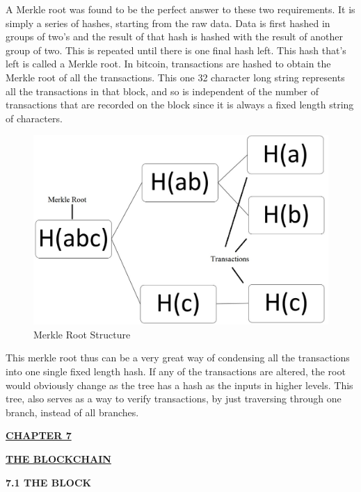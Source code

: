 \documentclass[12pt,a4paper]{report}
\begin{document}
\begin{justify}
A Merkle root was found to be the perfect answer to these two requirements. It is simply a series of hashes, starting from the raw data. Data is first hashed in groups of two's and the result of that hash is hashed with the result of another group of two. This is repeated until there is one final hash left. This hash that's left is called a Merkle root. In bitcoin, transactions are hashed to obtain the Merkle root of all the transactions. This one 32 character long string represents all the transactions in that block, and so is independent of the number of transactions that are recorded on the block since it is always a fixed length string of characters.\newline

\vspace{10mm}
\begin{figure}[h]
\centering
\caption{Merkle Root Structure}
\includegraphics[scale=0.4]{pics/Merkle.JPG}
\end{figure}
\vspace{10mm}
\newline
This merkle root thus can be a very great way of condensing all the transactions into one single fixed length hash. If any of the transactions are altered, the root would obviously change as the tree has a hash as the inputs in higher levels. This tree, also serves as a way to verify transactions, by just traversing through one branch, instead of all branches.

\newpage


\begin{center}\underline{ \Large \textbf{CHAPTER 7}}\end{center}
\begin{center}\underline{ \Large \textbf{THE BLOCKCHAIN}}\end{center}
\vspace{10mm}
\textbf{7.1 THE BLOCK}
\vspace{10mm}


\end{justify}
\end{document}
